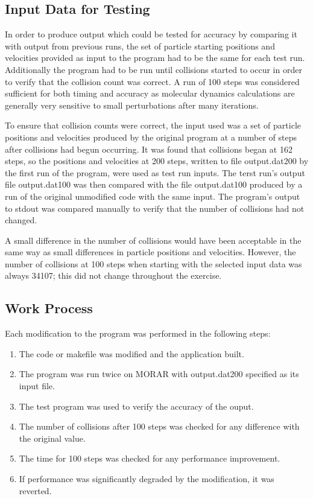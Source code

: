 \documentclass[11pt, oneside]{article}   %
\begin{document}
\subsection{Input Data for Testing}
In order to produce output which could be tested for accuracy by comparing it with output from previous runs, the set of particle starting positions and velocities provided as input to the program had to be the same for each test run.
Additionally the program had to be run until collisions started to occur in order to verify that the collision count was correct.
A run of 100 steps was considered sufficient for both timing and accuracy as molecular dynamics calculations are generally very sensitive to small perturbations after many iterations.  

To ensure that collision counts were correct, the input used was a set of particle positions and velocities produced by the original program at a number of steps after collisions had begun occurring.
It was found that collisions began at 162 steps, so the positions and velocities at 200 steps, written to file output.dat200 by the first run of the program, were used as test run inputs.
The terst run's output file output.dat100 was then compared with the file output.dat100 produced by a run of the original unmodified code with the same input.
The program's output to stdout was compared manually to verify that the number of collisions had not changed.

A small difference in the number of collisions would have been acceptable in the same way as small differences in particle positions and velocities.
However, the number of collisions at 100 steps when starting with the selected input data was always 34107; this did not change throughout the exercise.

\subsection{Work Process}
Each modification to the program was performed in the following steps:

\begin{enumerate}
	\item The code or makefile was modified and the application built.
	\item The program was run twice on MORAR with output.dat200 specified as its input file.
	\item The test program was used to verify the accuracy of the ouput.
	\item The number of collisions after 100 steps was checked for any difference with the original value.
	\item The time for 100 steps was checked for any performance improvement.
	\item If performance was significantly degraded by the modification, it was reverted. 
\end{enumerate}
\end{document}
